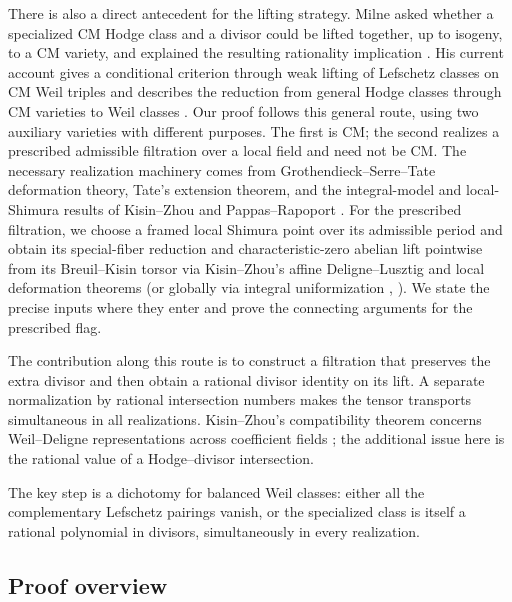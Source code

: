 There is also a direct antecedent for the lifting strategy. Milne asked
whether a specialized CM Hodge class and a divisor could be lifted
together, up to isogeny, to a CM variety, and explained the resulting
rationality implication \cite[Question~10.6 and Proposition~10.7]{MilneAIM2007}.
His current account gives a conditional criterion through weak lifting
of Lefschetz classes on CM Weil triples and describes the reduction
from general Hodge classes through CM varieties to Weil classes
\cite[Introduction, Question~2.17, and Theorem~2.18]{Milne2025}.
Our proof follows this general route, using two auxiliary varieties
with different purposes. The
first is CM; the second realizes a prescribed admissible filtration
over a local field and need not be CM. The necessary realization
machinery comes from Grothendieck--Serre--Tate deformation theory,
Tate's extension theorem, and the integral-model and local-Shimura
results of Kisin--Zhou and Pappas--Rapoport
\cite{Grothendieck1970,Tate1967,KisinZhou2025,PappasRapoport2024}.
For the prescribed filtration, we choose a framed local Shimura
point over its admissible period and obtain its special-fiber reduction
and characteristic-zero abelian lift pointwise from its Breuil--Kisin
torsor via Kisin--Zhou's affine Deligne--Lusztig and local deformation
theorems \cite[Proposition~2.2.3 and Theorem~2.2.5]{KisinZhou2025}
(or globally via integral uniformization \cite[Theorem~4.10.6]{PappasRapoport2024},
\cite[Corollary~6.3]{GleasonLimXu2026}). We state the precise inputs
where they enter and prove the connecting arguments for the
prescribed flag.

The contribution along this route is to construct a filtration that
preserves the extra divisor and then obtain a rational divisor identity
on its lift. A separate normalization by rational intersection numbers
makes the tensor transports simultaneous in all realizations.
Kisin--Zhou's compatibility theorem concerns Weil--Deligne
representations across coefficient fields
\cite[Theorem~1.2]{KisinZhou2025}; the additional issue here is the
rational value of a Hodge--divisor intersection.

The key step is a dichotomy for balanced Weil classes: either all the
complementary Lefschetz pairings vanish, or the specialized class is
itself a rational polynomial in divisors, simultaneously in every
realization.

\subsection{Proof overview}

